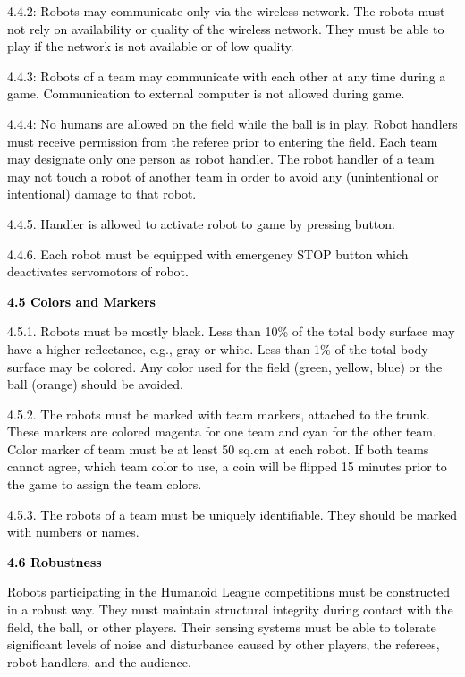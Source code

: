 \documentclass[a4paper]{article}
\begin{document}
\textcolor{black}{4.4.2: Robots may communicate only via the wireless network. The robots must not rely on availability
or quality of the wireless network. They must be able to play if the network is not available or of low quality.}

\textcolor{black}{4.4.3: Robots of a team may communicate with each other at any time during a game. Communication to
external computer is not allowed during game.}

\textcolor{black}{4.4.4: No humans are allowed on the field while the ball is in play. Robot handlers must receive
permission from the referee prior to entering the field. Each team may designate }\textcolor{black}{only one person as
robot handler. The robot handler of a team may not touch a robot of another team in order to avoid any (unintentional
or intentional) damage to that robot.}

\textcolor{black}{4.4.5. Handler is allowed to activate robot to game by pressing button.}

\textcolor{black}{4.4.6. Each robot must be equipped with emergency STOP button which deactivates servomotors of robot.}


\bigskip

\textbf{\textcolor{black}{4.5 Colors and Markers}}

\textcolor{black}{4.5.1. Robots must be mostly black. Less than 10\% of the total body surface may have a higher
reflectance, e.g., gray or white. Less than 1\% of the total body surface may be colored. Any color used for the field
(green, yellow, blue) or the ball (orange) should be avoided.}

\textcolor{black}{4.5.2. The robots must be marked with team markers, attached to the trunk. These markers are colored
magenta for one team and cyan for the other team. Color marker of team must be at least 50 sq.cm at each robot. If both
teams cannot agree, which team color to use, a coin will be flipped 15 minutes prior to the game to assign the team
colors.}

\textcolor{black}{4.5.3. The robots of a team must be uniquely identifiable. They should be marked with numbers or
names.}


\bigskip

\textbf{\textcolor{black}{4.6 Robustness}}

\textcolor{black}{Robots participating in the Humanoid League competitions must be constructed in a robust way. They
must maintain structural integrity during contact with the field, the ball, or other players. Their sensing systems
must be able to tolerate significant levels of noise and disturbance caused by other players, the referees, robot
handlers, and the audience.}
\end{document}
